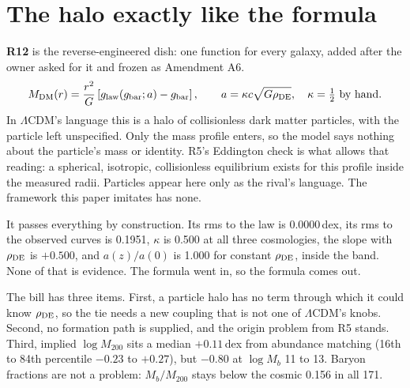 \documentclass[11pt]{article}
\begin{document}
\section{The halo exactly like the formula}
\textbf{R12} is the reverse-engineered dish: one function for every galaxy, added after the owner asked for it and frozen as Amendment A6.
\begin{equation}
M_{\rm DM}(r)=\frac{r^2}{G}\left[g_{\rm law}(g_{\rm bar};a)-g_{\rm bar}\right],\qquad a=\kappa c\sqrt{G\rho_{\rm DE}},\quad\kappa=\tfrac12\ \mbox{by hand}.
\end{equation}
In $\Lambda$CDM's language this is a halo of collisionless dark matter particles, with the particle left unspecified. Only the mass profile enters, so the model says nothing about the particle's mass or identity. R5's Eddington check is what allows that reading: a spherical, isotropic, collisionless equilibrium exists for this profile inside the measured radii. Particles appear here only as the rival's language. The framework this paper imitates has none.

It passes everything by construction. Its rms to the law is 0.0000\,dex, its rms to the observed curves is 0.1951, $\kappa$ is 0.500 at all three cosmologies, the slope with $\rho_{\rm DE}$ is $+0.500$, and $a(z)/a(0)$ is 1.000 for constant $\rho_{\rm DE}$, inside the band. None of that is evidence. The formula went in, so the formula comes out.

The bill has three items. First, a particle halo has no term through which it could know $\rho_{\rm DE}$, so the tie needs a new coupling that is not one of $\Lambda$CDM's knobs. Second, no formation path is supplied, and the origin problem from R5 stands. Third, implied $\log M_{200}$ sits a median $+0.11$\,dex from abundance matching (16th to 84th percentile $-0.23$ to $+0.27$), but $-0.80$ at $\log M_b$ 11 to 13. Baryon fractions are not a problem: $M_b/M_{200}$ stays below the cosmic 0.156 in all 171.
\end{document}
